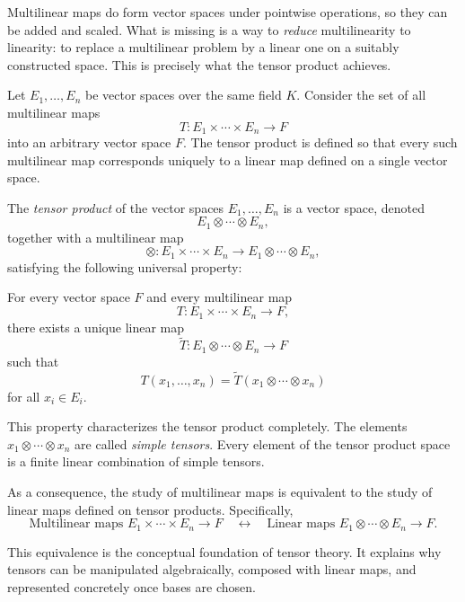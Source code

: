 \medskip

Multilinear maps do form vector spaces under pointwise operations, so they can
be added and scaled.
What is missing is a way to \emph{reduce} multilinearity to linearity: to
replace a multilinear problem by a linear one on a suitably constructed space.
This is precisely what the tensor product achieves.

\medskip

Let \(E_1,\dots,E_n\) be vector spaces over the same field \(K\).
Consider the set of all multilinear maps
\[
T : E_1 \times \cdots \times E_n \longrightarrow F
\]
into an arbitrary vector space \(F\).
The tensor product is defined so that every such multilinear map corresponds
uniquely to a linear map defined on a single vector space.

\medskip

\begin{definition}
The \emph{tensor product} of the vector spaces \(E_1,\dots,E_n\) is a vector
space, denoted
\[
E_1 \otimes \cdots \otimes E_n,
\]
together with a multilinear map
\[
\otimes : E_1 \times \cdots \times E_n \longrightarrow
E_1 \otimes \cdots \otimes E_n,
\]
satisfying the following universal property:

For every vector space \(F\) and every multilinear map
\[
T : E_1 \times \cdots \times E_n \longrightarrow F,
\]
there exists a unique linear map
\[
\widetilde{T} : E_1 \otimes \cdots \otimes E_n \longrightarrow F
\]
such that
\[
T(x_1,\dots,x_n) = \widetilde{T}(x_1 \otimes \cdots \otimes x_n)
\]
for all \(x_i \in E_i\).
\end{definition}

\medskip

This property characterizes the tensor product completely.
The elements \(x_1 \otimes \cdots \otimes x_n\) are called \emph{simple tensors}.
Every element of the tensor product space is a finite linear combination of
simple tensors.

\medskip

As a consequence, the study of multilinear maps is equivalent to the study of
linear maps defined on tensor products.
Specifically,
\[
\text{Multilinear maps } E_1 \times \cdots \times E_n \to F
\quad\longleftrightarrow\quad
\text{Linear maps } E_1 \otimes \cdots \otimes E_n \to F.
\]

\medskip

This equivalence is the conceptual foundation of tensor theory.
It explains why tensors can be manipulated algebraically, composed with linear
maps, and represented concretely once bases are chosen.


